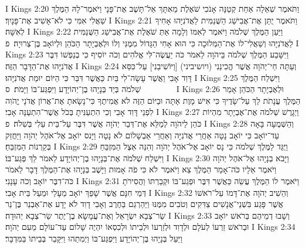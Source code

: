 I Kings 2:20	וַתֹּאמֶר שְׁאֵלָה אַחַת קְטַנָּה אָנֹכִי שֹׁאֶלֶת מֵאִתָּךְ אַל־תָּשֶׁב אֶת־פָּנָי וַיֹּאמֶר־לָהּ הַמֶּלֶךְ שַׁאֲלִי אִמִּי כִּי לֹא־אָשִׁיב אֶת־פָּנָיִךְ׃
I Kings 2:21	וַתֹּאמֶר יֻתַּן אֶת־אֲבִישַׁג הַשֻּׁנַמִּית לַאֲדֹנִיָּהוּ אָחִיךָ לְאִשָּׁה׃
I Kings 2:22	וַיַּעַן הַמֶּלֶךְ שְׁלֹמֹה וַיֹּאמֶר לְאִמּוֹ וְלָמָה אַתְּ שֹׁאֶלֶת אֶת־אֲבִישַׁג הַשֻּׁנַמִּית לַאֲדֹנִיָּהוּ וְשַׁאֲלִי־לוֹ אֶת־הַמְּלוּכָה כִּי הוּא אָחִי הַגָּדוֹל מִמֶּנִּי וְלוֹ וּלְאֶבְיָתָר הַכֹּהֵן וּלְיוֹאָב בֶּן־צְרוּיָה׃ {פ}
I Kings 2:23	וַיִּשָּׁבַע הַמֶּלֶךְ שְׁלֹמֹה בַּיהֹוָה לֵאמֹר כֹּה יַעֲשֶׂה־לִּי אֱלֹהִים וְכֹה יוֹסִיף כִּי בְנַפְשׁוֹ דִּבֶּר אֲדֹנִיָּהוּ אֶת־הַדָּבָר הַזֶּה׃
I Kings 2:24	וְעַתָּה חַי־יְהֹוָה אֲשֶׁר הֱכִינַנִי (ויושיביני) [וַיּוֹשִׁיבַנִי] עַל־כִּסֵּא דָּוִד אָבִי וַאֲשֶׁר עָשָׂה־לִי בַּיִת כַּאֲשֶׁר דִּבֵּר כִּי הַיּוֹם יוּמַת אֲדֹנִיָּהוּ׃
I Kings 2:25	וַיִּשְׁלַח הַמֶּלֶךְ שְׁלֹמֹה בְּיַד בְּנָיָהוּ בֶן־יְהוֹיָדָע וַיִּפְגַּע־בּוֹ וַיָּמֹת׃ {ס}        
I Kings 2:26	וּלְאֶבְיָתָר הַכֹּהֵן אָמַר הַמֶּלֶךְ עֲנָתֹת לֵךְ עַל־שָׂדֶיךָ כִּי אִישׁ מָוֶת אָתָּה וּבַיּוֹם הַזֶּה לֹא אֲמִיתֶךָ כִּי־נָשָׂאתָ אֶת־אֲרוֹן אֲדֹנָי יֱהֹוִה לִפְנֵי דָּוִד אָבִי וְכִי הִתְעַנִּיתָ בְּכֹל אֲשֶׁר־הִתְעַנָּה אָבִי׃
I Kings 2:27	וַיְגָרֶשׁ שְׁלֹמֹה אֶת־אֶבְיָתָר מִהְיוֹת כֹּהֵן לַיהֹוָה לְמַלֵּא אֶת־דְּבַר יְהֹוָה אֲשֶׁר דִּבֶּר עַל־בֵּית עֵלִי בְּשִׁלֹה׃ {פ}
I Kings 2:28	וְהַשְּׁמֻעָה בָּאָה עַד־יוֹאָב כִּי יוֹאָב נָטָה אַחֲרֵי אֲדֹנִיָּה וְאַחֲרֵי אַבְשָׁלוֹם לֹא נָטָה וַיָּנס יוֹאָב אֶל־אֹהֶל יְהֹוָה וַיַּחֲזֵק בְּקַרְנוֹת הַמִּזְבֵּחַ׃
I Kings 2:29	וַיֻּגַּד לַמֶּלֶךְ שְׁלֹמֹה כִּי נָס יוֹאָב אֶל־אֹהֶל יְהֹוָה וְהִנֵּה אֵצֶל הַמִּזְבֵּחַ וַיִּשְׁלַח שְׁלֹמֹה אֶת־בְּנָיָהוּ בֶן־יְהוֹיָדָע לֵאמֹר לֵךְ פְּגַע־בּוֹ׃
I Kings 2:30	וַיָּבֹא בְנָיָהוּ אֶל־אֹהֶל יְהֹוָה וַיֹּאמֶר אֵלָיו כֹּה־אָמַר הַמֶּלֶךְ צֵא וַיֹּאמֶר  לֹא כִּי פֹה אָמוּת וַיָּשֶׁב בְּנָיָהוּ אֶת־הַמֶּלֶךְ דָּבָר לֵאמֹר כֹּה־דִבֶּר יוֹאָב וְכֹה עָנָנִי׃
I Kings 2:31	וַיֹּאמֶר לוֹ הַמֶּלֶךְ עֲשֵׂה כַּאֲשֶׁר דִּבֶּר וּפְגַע־בּוֹ וּקְבַרְתּוֹ וַהֲסִירֹתָ  דְּמֵי חִנָּם אֲשֶׁר שָׁפַךְ יוֹאָב מֵעָלַי וּמֵעַל בֵּית אָבִי׃
I Kings 2:32	וְהֵשִׁיב יְהֹוָה אֶת־דָּמוֹ עַל־רֹאשׁוֹ אֲשֶׁר פָּגַע בִּשְׁנֵי־אֲנָשִׁים צַדִּקִים וְטֹבִים מִמֶּנּוּ וַיַּהַרְגֵם בַּחֶרֶב וְאָבִי דָוִד לֹא יָדָע אֶת־אַבְנֵר בֶּן־נֵר שַׂר־צְבָא יִשְׂרָאֵל וְאֶת־עֲמָשָׂא בֶן־יֶתֶר שַׂר־צְבָא יְהוּדָה׃
I Kings 2:33	וְשָׁבוּ דְמֵיהֶם בְּרֹאשׁ יוֹאָב וּבְרֹאשׁ זַרְעוֹ לְעֹלָם וּלְדָוִד וּלְזַרְעוֹ וּלְבֵיתוֹ וּלְכִסְאוֹ יִהְיֶה שָׁלוֹם עַד־עוֹלָם מֵעִם יְהֹוָה׃
I Kings 2:34	וַיַּעַל בְּנָיָהוּ בֶּן־יְהוֹיָדָע וַיִּפְגַּע־בּוֹ וַיְמִתֵהוּ וַיִּקָּבֵר בְּבֵיתוֹ בַּמִּדְבָּר׃
